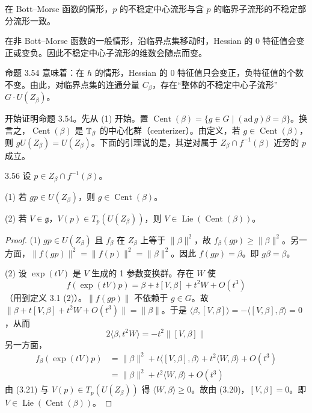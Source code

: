 在 Bott–Morse 函数的情形，$p$ 的不稳定中心流形与含 $p$ 的临界子流形的不稳定部分流形一致。

在非 Bott–Morse 函数的一般情形，沿临界点集移动时，Hessian 的 0 特征值会变正或变负。因此不稳定中心子流形的维数会随点而变。

命题 3.54 意味着：在 $h$ 的情形，Hessian 的 0 特征值只会变正，负特征值的个数不变。由此，对临界点集的连通分量 $C_\beta$，存在“整体的不稳定中心子流形” $G\cdot U(Z_\beta)$。

开始证明命题 3.54。先从 (1) 开始。置 $\operatorname{Cent}(\beta)=\{g\in G\mid(\mathrm{ad}\,g)\beta=\beta\}$。换言之，$\operatorname{Cent}(\beta)$ 是 $\mathbb{T}_\beta$ 的中心化群（centerizer）。由定义，若 $g\in\operatorname{Cent}(\beta)$，则 $gU(Z_\beta)=U(Z_\beta)$。下面的引理说的是，其逆对属于 $Z_\beta\cap f^{-1}(\beta)$ 近旁的 $p$ 成立。

\begin{lemma*}{3.56}
  设 $p\in Z_\beta\cap f^{-1}(\beta)$。

  (1) 若 $gp\in U(Z_\beta)$，则 $g\in\operatorname{Cent}(\beta)$。

  (2) 若 $V\in\mathfrak{g}$，$V(p)\in T_p(U(Z_\beta))$，则 $V\in\operatorname{Lie}(\operatorname{Cent}(\beta))$。
\end{lemma*}

\begin{proof}
  (1) $gp\in U(Z_\beta)$ 且 $f_\beta$ 在 $Z_\beta$ 上等于 $\|\beta\|^2$，故 $f_\beta(gp)\ge\|\beta\|^2$。另一方面，$\|f(gp)\|^2=\|f(p)\|^2=\|\beta\|^2$。因此 $f(gp)=\beta$。即 $g\beta=\beta$。

  (2) 设 $\exp(tV)$ 是 $V$ 生成的 1 参数变换群。存在 $W$ 使
  \[
    f(\exp(tV)p)=\beta+t[V,\beta]+t^2W+O(t^3)
  \]
  （用到定义 3.1 (2)）。$\|f(gp)\|$ 不依赖于 $g\in G$。故 $\|\beta+t[V,\beta]+t^2W+O(t^3)\|=\|\beta\|$。于是 $\langle\beta,[V,\beta]\rangle=-\langle[V,\beta],\beta\rangle=0$，从而
  \begin{equation}
    2\langle\beta,t^2W\rangle=-t^2\|[V,\beta]\| \tag{3.20}
  \end{equation}
  另一方面，
  \begin{equation}
    \begin{aligned}
      f_\beta(\exp(tV)p)&=\|\beta\|^2+t\langle[V,\beta],\beta\rangle+t^2\langle W,\beta\rangle+O(t^3)\\
      &=\|\beta\|^2+t^2\langle W,\beta\rangle+O(t^3)
    \end{aligned}
    \tag{3.21}
  \end{equation}
  由 (3.21) 与 $V(p)\in T_p(U(Z_\beta))$ 得 $\langle W,\beta\rangle\ge0$。故由 (3.20)，$[V,\beta]=0$。即 $V\in\operatorname{Lie}(\operatorname{Cent}(\beta))$。
\end{proof}

